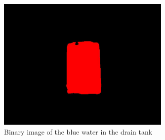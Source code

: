 \begin{figure}[t!]
	\centering
	\includegraphics[width=0.75\textwidth]{pictures/BIN}
	\caption{Binary image of the blue water in the drain tank}
	\label{img:BIN}
\end{figure}